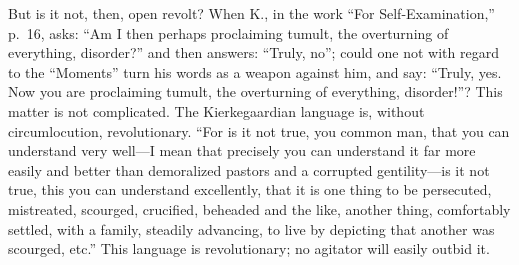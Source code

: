 \documentclass[12pt,a4paper]{article}
\newcommand{\opage}[1]{\marginnote{\footnotesize\textit{[#1]}}}
\begin{document}
But is it not, then, open revolt? When K., in
the work ``For Self-Examination,'' p.\ 16, asks: ``Am I then
perhaps proclaiming tumult, the overturning of everything, disorder?'' and
then answers: ``Truly, no''; could one not
with regard to the ``Moments'' turn his words as a
weapon against him, and say: ``Truly, yes. Now you are proclaiming
tumult, the overturning of everything, disorder!''? This matter
is not complicated. The Kierkegaardian language is, without
circumlocution, revolutionary. ``For is it not true, you common
man, that you can understand very well---I mean that
precisely you can understand it far more easily and better than
demoralized pastors and a corrupted gentility---is it not
true, this you can understand excellently, that it is one thing
to be persecuted, mistreated, scourged, crucified, beheaded
\opage{28}and the like, another thing, comfortably settled, with a
family, steadily advancing, to live by depicting that another
was scourged, etc.'' This language is revolutionary;
no agitator will easily outbid it.
\end{document}
